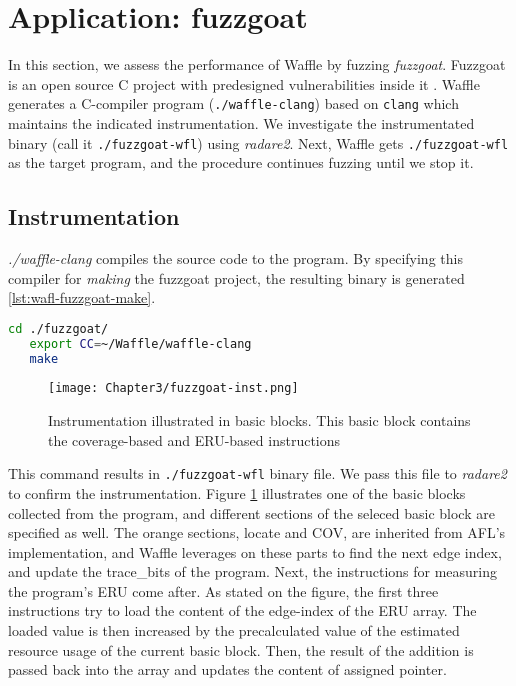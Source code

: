 \section{Application: fuzzgoat}
\label{sec:3-3}

In this section, we assess the performance of Waffle by fuzzing \textit{fuzzgoat}. Fuzzgoat is an open source C project with predesigned vulnerabilities inside it \cite{fuzzgoat}. Waffle generates a C-compiler program (\texttt{./waffle-clang}) based on \texttt{clang} which maintains the indicated instrumentation. We investigate the instrumentated binary (call it \texttt{./fuzzgoat-wfl}) using \textit{radare2}. Next, Waffle gets \texttt{./fuzzgoat-wfl} as the target program, and the procedure continues fuzzing until we stop it. 


\subsection{Instrumentation}

\textit{./waffle-clang} compiles the source code to the program. By specifying this compiler for \textit{making} the fuzzgoat project, the resulting binary is generated \ref{lst:wafl-fuzzgoat-make}.

\begin{lstlisting}[language=bash,style=CommandStyle,label={lst:wafl-fuzzgoat-make}]
   cd ./fuzzgoat/
   export CC=~/Waffle/waffle-clang
   make
\end{lstlisting}


\begin{figure}[!b]
   \texttt{[image: Chapter3/fuzzgoat-inst.png]}
   \centering
   \caption{Instrumentation illustrated in basic blocks. This basic block contains the coverage-based and ERU-based instructions}
   \label{fig:fuzzgoat-inst}
\end{figure}

This command results in \texttt{./fuzzgoat-wfl} binary file. We pass this file to \textit{radare2} to confirm the instrumentation. Figure \ref{fig:fuzzgoat-inst} illustrates one of the basic blocks collected from the program, and different sections of the seleced basic block are specified as well. The orange sections, locate and COV, are inherited from AFL's implementation, and Waffle leverages on these parts to find the next edge index, and update the trace\_bits of the program. Next, the instructions for measuring the program's ERU come after. As stated on the figure, the first three instructions try to load the content of the edge-index of the ERU array. The loaded value is then increased by the precalculated value of the estimated resource usage of the current basic block. Then, the result of the addition is passed back into the array and updates the content of assigned pointer.

